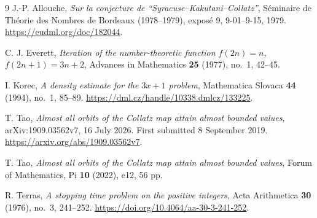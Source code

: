\begin{thebibliography}{9}
J.-P. Allouche, \emph{Sur la conjecture de ``Syracuse--Kakutani--Collatz''},
S\'eminaire de Th\'eorie des Nombres de Bordeaux (1978--1979),
expos\'e 9, 9-01--9-15, 1979.
\url{https://eudml.org/doc/182044}.

C. J. Everett, \emph{Iteration of the number-theoretic function
$f(2n)=n$, $f(2n+1)=3n+2$}, Advances in Mathematics
\textbf{25} (1977), no.~1, 42--45.

I. Korec, \emph{A density estimate for the $3x+1$ problem},
Mathematica Slovaca \textbf{44} (1994), no.~1, 85--89.
\url{https://dml.cz/handle/10338.dmlcz/133225}.

T. Tao, \emph{Almost all orbits of the Collatz map attain almost bounded
values}, arXiv:1909.03562v7, 16 July 2026. First submitted 8 September 2019.
\url{https://arxiv.org/abs/1909.03562v7}.

T. Tao, \emph{Almost all orbits of the Collatz map attain almost bounded
values}, Forum of Mathematics, Pi \textbf{10} (2022), e12, 56 pp.

R. Terras, \emph{A stopping time problem on the positive integers},
Acta Arithmetica \textbf{30} (1976), no.~3, 241--252.
\url{https://doi.org/10.4064/aa-30-3-241-252}.
\end{thebibliography}
